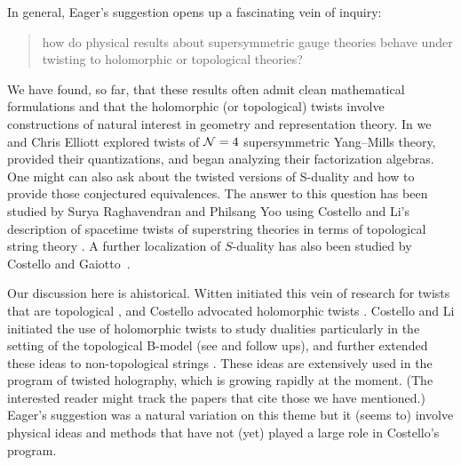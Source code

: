 \documentclass[11pt]{amsart}
\begin{document}
In general, Eager's suggestion opens up a fascinating vein of inquiry:
\begin{quote}
how do physical results about supersymmetric gauge theories behave under twisting to holomorphic or topological theories?
\end{quote}
We have found, so far, that these results often admit clean mathematical formulations and that the holomorphic (or topological) twists involve constructions of natural interest in geometry and representation theory.
In \cite{EGW} we and Chris Elliott explored twists of $\mathcal N=4$ supersymmetric Yang--Mills theory,
provided their quantizations, and began analyzing their factorization algebras.
One might can also ask about the twisted versions of S-duality and how to provide those conjectured equivalences.
The answer to this question has been studied by Surya Raghavendran and Philsang Yoo \cite{RYsduality} using Costello and Li's description of spacetime twists of superstring theories in terms of topological string theory \cite{CLsugra,CLtypeI}. 
A further localization of $S$-duality has also been studied by Costello and Gaiotto~\cite{CGholography}.

\begin{rmk}
Our discussion here is ahistorical.
Witten initiated this vein of research for twists that are topological \cite{WittenTwist},
and Costello advocated holomorphic twists \cite{CosSUSY}.  
Costello and Li initiated the use of holomorphic twists to study dualities particularly in the setting of the topological B-model (see \cite{CLbcov} and follow ups), and further extended these ideas to non-topological strings \cite{CLsugra}. 
These ideas are extensively used in the program of twisted holography, which is growing rapidly at the moment.
(The interested reader might track the papers that cite those we have mentioned.)
Eager's suggestion was a natural variation on this theme but it (seems to) involve physical ideas and methods that have not (yet) played a large role in Costello's program.
\end{rmk}

\printbibliography
\end{document}

